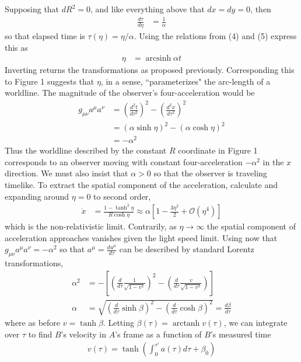 \documentclass[10pt]{scrartcl}
\DeclareMathOperator{\arcsinh}{arcsinh}
\DeclareMathOperator{\arctanh}{arctanh}
\begin{document}
Supposing that $dR^2 = 0$, and like everything above that $dx=dy=0$, then
\begin{align}
\frac{d\tau}{d\eta} &=\frac{1}{\alpha}
\end{align}
so that elapsed time is $\tau(\eta)=\eta/\alpha$. Using the relations from (4) and (5) express this as
\begin{align}
	\eta &= \arcsinh{\alpha t}	
\end{align}
Inverting returns the transformations as proposed previously. Corresponding this to Figure 1 suggests that $\eta$, in a sense, ``parameterizes" the arc-length of a worldline. The magnitude of the observer's four-acceleration would be
\begin{align}
g_{\mu\nu}a^{\mu}a^{\nu} &= \left(\frac{d^2 t}{d\tau^2}\right)^2 - \left(\frac{d^2 x}{d\tau^2}\right)^2 \\
&= (\alpha\sinh{\eta})^2 - (\alpha\cosh{\eta})^2 \\
&= -\alpha^2	
\end{align}
Thus the worldline described by the constant $R$ coordinate in Figure 1 corresponds to an observer moving with constant four-acceleration $-\alpha^2$ in the $x$ direction. We must also insist that $\alpha>0$ so that the observer is traveling timelike. To extract the spatial component of the acceleration, calculate and expanding around $\eta=0$ to second order,
\begin{align}
\ddot{x}	&= \frac{1-\tanh^2{\eta}}{R\cosh{\eta}}\approx \alpha\left[1-\frac{3\eta^2}{2} + \mathcal{O}(\eta^4)\right]
\end{align}
which is the non-relativistic limit. Contrarily, as $\eta\to\infty$ the spatial component of acceleration approaches vanishes given the light speed limit.
 Using now that $g_{\mu\nu}a^{\mu}a^{\nu}=-\alpha^2$ so that $a^\mu = \frac{d u^\mu}{d\tau}$ can be described by standard Lorentz transformations,
\begin{align}
\alpha^2 &= -\left[\left(\frac{d}{d\tau}\frac{1}{\sqrt{1-v^2}}\right)^2 - \left(\frac{d}{d\tau}\frac{v}{\sqrt{1-v^2}}\right)\right]	\\
\alpha &=  \sqrt{\left(\frac{d}{d\tau}\sinh{\beta}\right)^2-\left(\frac{d}{d\tau}\cosh{\beta}\right)^2} =\frac{d\beta}{d\tau}
\end{align}
where as before $v=\tanh{\beta}$. Letting $\beta(\tau) = \arctanh{v(\tau)}$, we can integrate over $\tau$ to find $B$'s velocity in $A$'s frame as a function of $B$'s measured time 
\begin{align}
	v(\tau) = \tanh{\left(\int_{0}^{\tau'}a(\tau)d\tau + \beta_0\right)}
\end{align}
\end{document}
